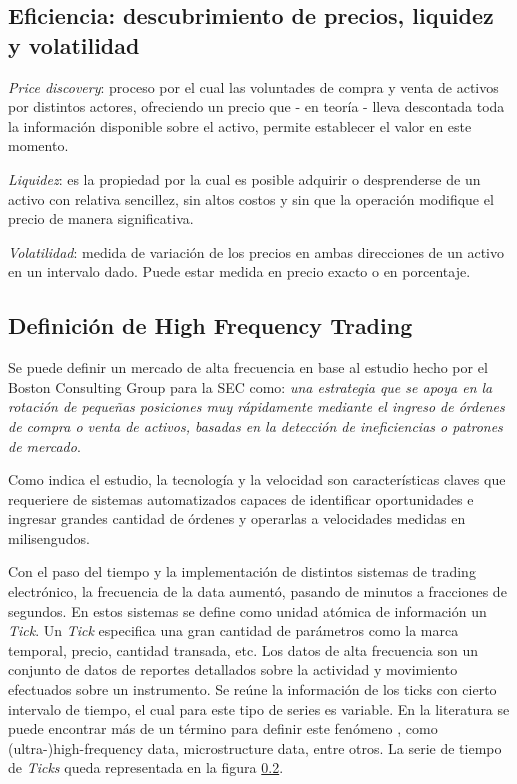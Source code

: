 \subsection{Eficiencia: descubrimiento de precios, liquidez y volatilidad}

\emph{Price discovery}: proceso por el cual las voluntades de compra y venta de
activos por distintos actores, ofreciendo un precio que - en teoría - lleva
descontada toda la información disponible sobre el activo, permite establecer
el valor en este momento.

\emph{Liquidez}: es la propiedad por la cual es posible adquirir o desprenderse
de un activo con relativa sencillez, sin altos costos y sin que la operación
modifique el precio de manera significativa.

\emph{Volatilidad}: medida de variación de los precios en ambas direcciones de
un activo en un intervalo dado. Puede estar medida en precio exacto o en
porcentaje.


\subsection{Definición de High Frequency Trading}

Se puede definir un mercado de alta frecuencia en base al estudio hecho por el
Boston Consulting Group para la SEC como: \emph{una estrategia que se apoya
en la rotación de pequeñas posiciones muy rápidamente mediante el ingreso de
órdenes de compra o venta de activos, basadas en la detección de ineficiencias
o patrones de mercado}.%

Como indica el estudio, la tecnología y la velocidad son características claves
que requeriere de sistemas automatizados capaces de identificar oportunidades
e ingresar grandes cantidad de órdenes y operarlas a velocidades medidas en
milisengudos.

Con el paso del tiempo y la implementación de distintos sistemas de trading
electrónico, la frecuencia de la data aumentó, pasando de minutos a fracciones
de segundos.  En estos sistemas se define como unidad atómica de información un
\emph{Tick}. Un \emph{Tick} especifica una gran cantidad de parámetros como la
marca temporal, precio, cantidad transada, etc. Los datos de alta frecuencia
son un conjunto de datos de reportes detallados sobre la actividad y movimiento
efectuados sobre un instrumento. Se reúne la información de los ticks con
cierto intervalo de tiempo, el cual para este tipo de series es variable. En la
literatura se puede encontrar más de un término para definir este fenómeno
\cite{ei2007quantitative}, como (ultra-)high-frequency data, microstructure
data, entre otros. La serie de tiempo de \emph{Ticks} queda representada en
la figura \ref{}.

